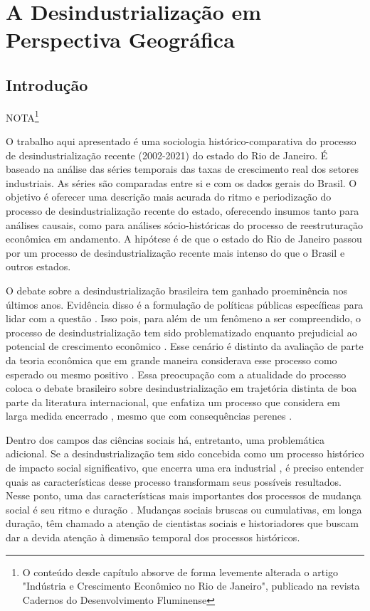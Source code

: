 \chapter{A Desindustrialização em Perspectiva Geográfica}

\section{Introdução}

NOTA\footnote{O conteúdo desde capítulo absorve de forma levemente alterada
o artigo "Indústria e Crescimento Econômico no Rio de Janeiro", publicado
na revista Cadernos do Desenvolvimento Fluminense}

O trabalho aqui apresentado é uma sociologia histórico-comparativa do
processo de desindustrialização recente (2002-2021) do estado do Rio de
Janeiro. É baseado na análise das séries temporais das taxas de
crescimento real dos setores industriais. As séries são comparadas entre
si e com os dados gerais do Brasil. O objetivo é oferecer uma descrição
mais acurada do ritmo e periodização do processo de desindustrialização
recente do estado, oferecendo insumos tanto para análises causais, como
para análises sócio-históricas do processo de reestruturação econômica
em andamento. A hipótese é de que o estado do Rio de Janeiro passou por
um processo de desindustrialização recente mais intenso do que o Brasil
e outros estados.

O debate sobre a desindustrialização brasileira tem ganhado proeminência
nos últimos anos. Evidência disso é a formulação de políticas públicas
específicas para lidar com a questão
\citep{cndi_nova_2024}.
Isso pois, para além de um fenômeno a ser compreendido, o processo de
desindustrialização tem sido problematizado enquanto prejudicial ao
potencial de crescimento econômico
\citep{oreiro_desindustrializacao_2010}. Esse cenário é distinto da avaliação de parte da teoria
econômica que em grande maneira considerava esse processo como esperado
ou mesmo positivo
\citep{oreiromarconi2012}. Essa preocupação com a atualidade do processo coloca o debate
brasileiro sobre desindustrialização em trajetória distinta de boa parte
da literatura internacional, que enfatiza um processo que considera em
larga medida encerrado
 \citep{lawson_making_2020,strangleman_introduction_2013}, mesmo que com consequências
perenes \citep{linkon_half-life_2018,mah_industrial_2012}.

Dentro dos campos das ciências sociais há, entretanto, uma problemática
adicional. Se a desindustrialização tem sido concebida como um processo
histórico de impacto social significativo, que encerra uma era
industrial
\citep{strangleman_deindustrialisation_2017},
é preciso entender quais as características desse processo transformam
seus possíveis resultados. Nesse ponto, uma das características mais
importantes dos processos de mudança social é seu ritmo e duração
\citep{abbott_event_1984,pierson_politics_2004}. Mudanças sociais bruscas ou cumulativas, em longa
duração, têm chamado a atenção de cientistas sociais e historiadores que
buscam dar a devida atenção à dimensão temporal dos processos
históricos.

